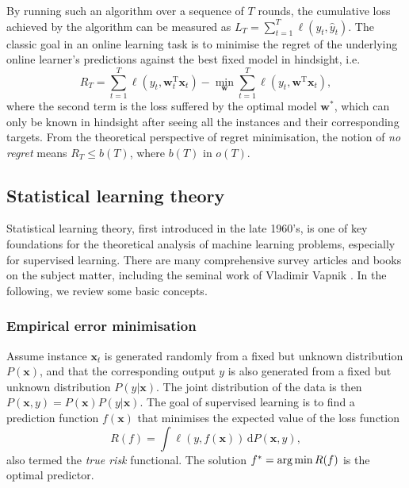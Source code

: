 \begin{mccorrection}
By running such an algorithm over a sequence of $T$ rounds, the cumulative loss achieved by the algorithm can be measured as $L_T = \sum_{t=1}^T \ell(y_t, \hat{y}_t)$. The classic goal in an online learning task is to minimise the regret of the underlying online learner's predictions against the best fixed model in hindsight, i.e.\
\begin{equation}
	R_T = \sum_{t=1}^T \ell(y_t, \mathbf{w}_t^\text{T} \mathbf{x}_t) - \min_{\mathbf{w}} \sum_{t=1}^T \ell(y_t, \mathbf{w}^\text{T} \mathbf{x}_t),
\end{equation}
where the second term is the loss suffered by the optimal model $\mathbf{w}^*$, which can only be known in hindsight after seeing all the instances and their corresponding targets. From the theoretical perspective of regret minimisation, the notion of \emph{no regret} means $R_T \leq b(T)$, where $b(T)$ in $o(T)$.
\end{mccorrection}

\subsection{Statistical learning theory}

Statistical learning theory, first introduced in the late 1960's, is one of key foundations for the theoretical analysis of machine learning problems, especially for supervised learning. There are many comprehensive survey articles and books on the subject matter, including the seminal work of Vladimir Vapnik \citep{vapnik98, vapnik99}. In the following, we review some basic concepts.

\subsubsection{Empirical error minimisation}

Assume instance $\mathbf{x}_t$ is generated randomly from a fixed but unknown distribution $P(\mathbf{x})$, and that the corresponding output $y$ is also generated from a fixed but unknown distribution $P(y|\mathbf{x})$. The joint distribution of the data is then $P(\mathbf{x}, y) = P(\mathbf{x}) P(y|\mathbf{x})$. The goal of supervised learning is to find a prediction function $f(\mathbf{x})$ that minimises the expected value of the loss function
\begin{equation}
	R(f) = \int \ell(y, f(\mathbf{x})) \, \mathrm{d} P(\mathbf{x}, y),
\end{equation}
also termed the \emph{true risk} functional. The solution $f^* = \operatorname*{arg\,min} R(f)$ is the optimal predictor.

